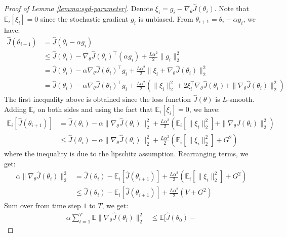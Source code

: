 \begin{proof}[Proof of Lemma \ref{lemma:sgd-parameter}]
  Denote $\xi_i = g_i - \nabla_\theta {\hat{J}}(\theta_i)$.  Note that $\mathbb{E}_{i} [\xi_i] =
0$ since the stochastic gradient $g_i$ is unbiased.
From  $\theta_{i+1} = \theta_i - \alpha g_i$, we have:
\begin{align*}
  \hat{J}(\theta_{i+1}) & = \hat{J}(\theta_{i} - \alpha g_i)\\
  &\leq\hat{J}(\theta_i) - \nabla_\theta \hat{J}(\theta_i)^{\top} (\alpha g_i) + \frac{L\alpha^2}{2}\| g_i\|_2^2  \\
    & = \hat{J}(\theta_i) - \alpha \nabla_\theta \hat{J}(\theta_i)^{\top} g_i + \frac{L\alpha^2}{2} \|\xi_i + \nabla_\theta \hat{J}(\theta_i)\|^2_2 \\
    & = \hat{J}(\theta_i) - \alpha \nabla_\theta
      \hat{J}(\theta_i)^{\top} g_i + \frac{L\alpha^2}{2}(\|\xi_i\|_2^2
  + 2\xi_i^{\top}\nabla_\theta \hat{J}(\theta_i) + \|\nabla_\theta \hat{J}(\theta_i)\|_2^2 )
\end{align*} The first inequality above is obtained since the loss
function $\hat{J}(\theta)$ is $L$-smooth. Adding $\mathbb{E}_i$ on both sides and using the fact that $\mathbb{E}_i [\xi_i] = 0$, we have:
\begin{align*}
    \mathbb{E}_i [\hat{J}(\theta_{i+1})] &= \hat{J}(\theta_i) - \alpha
                                           \|\nabla_\theta
                                           \hat{J}(\theta_i)\|_2^2  +\frac{L\alpha^2}{2}\left( \mathbb{E}_i [\|\xi_i\|_2^2] + \|\nabla_\theta \hat{J}(\theta_i)\|_2^2  \right)  \\
    &\leq \hat{J}(\theta_i) - \alpha \|\nabla_\theta
      \hat{J}(\theta_i)\|_2^2 + \frac{L\alpha^2}{2}\left( \mathbb{E}_i [\|\xi_i\|_2^2] + G^2  \right)
\end{align*}
where the inequality is due to the lipschitz assumption. Rearranging terms, we get:
\begin{align*}
    \alpha\|\nabla_\theta \hat{J}(\theta_i)\|_2^2 &= \hat{J}(\theta_i)
      - \mathbb{E}_i [\hat{J}(\theta_{i+1})] + \frac{L\alpha^2}{2} (\mathbb{E}_i [\|\xi_i\|_2^2] + G^2) \\
    & \leq \hat{J}(\theta_i) - \mathbb{E}_i[ \hat{J}(\theta_{i+1})] + \frac{L\alpha^2}{2} (V + G^2)
\end{align*}
Sum over from time step $1$ to $T$, we get:
\begin{align*}
    \alpha \sum_{t=1}^T \mathbb{E}\|\nabla_\theta
  \hat{J}(\theta_i)\|_2^2 &\leq \mathbb{E} [\hat{J}(\theta_0) -

\end{align*}
\end{proof}
